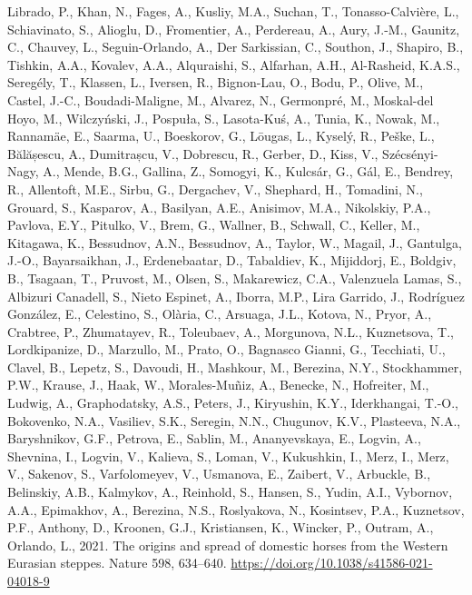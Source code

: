 \documentclass[preprint, 3p, authoryear]{elsarticle} %
\newlength{\cslhangindent}
\newlength{\cslentryspacingunit} %
\newenvironment{CSLReferences}[2] %
 {%
  \setlength{\parindent}{0pt}
  \ifodd #1
  \let\oldpar\par
  \def\par{\hangindent=\cslhangindent\oldpar}
  \fi
  \setlength{\parskip}{#2\cslentryspacingunit}
 }%
 {}
\begin{document}
\begin{CSLReferences}{1}{0}
\leavevmode{}%
Librado, P., Khan, N., Fages, A., Kusliy, M.A., Suchan, T., Tonasso-Calvière, L., Schiavinato, S., Alioglu, D., Fromentier, A., Perdereau, A., Aury, J.-M., Gaunitz, C., Chauvey, L., Seguin-Orlando, A., Der Sarkissian, C., Southon, J., Shapiro, B., Tishkin, A.A., Kovalev, A.A., Alquraishi, S., Alfarhan, A.H., Al-Rasheid, K.A.S., Seregély, T., Klassen, L., Iversen, R., Bignon-Lau, O., Bodu, P., Olive, M., Castel, J.-C., Boudadi-Maligne, M., Alvarez, N., Germonpré, M., Moskal-del Hoyo, M., Wilczyński, J., Pospuła, S., Lasota-Kuś, A., Tunia, K., Nowak, M., Rannamäe, E., Saarma, U., Boeskorov, G., Lōugas, L., Kyselý, R., Peške, L., Bălășescu, A., Dumitrașcu, V., Dobrescu, R., Gerber, D., Kiss, V., Szécsényi-Nagy, A., Mende, B.G., Gallina, Z., Somogyi, K., Kulcsár, G., Gál, E., Bendrey, R., Allentoft, M.E., Sirbu, G., Dergachev, V., Shephard, H., Tomadini, N., Grouard, S., Kasparov, A., Basilyan, A.E., Anisimov, M.A., Nikolskiy, P.A., Pavlova, E.Y., Pitulko, V., Brem, G., Wallner, B., Schwall, C., Keller, M., Kitagawa, K., Bessudnov, A.N., Bessudnov, A., Taylor, W., Magail, J., Gantulga, J.-O., Bayarsaikhan, J., Erdenebaatar, D., Tabaldiev, K., Mijiddorj, E., Boldgiv, B., Tsagaan, T., Pruvost, M., Olsen, S., Makarewicz, C.A., Valenzuela Lamas, S., Albizuri Canadell, S., Nieto Espinet, A., Iborra, M.P., Lira Garrido, J., Rodríguez González, E., Celestino, S., Olària, C., Arsuaga, J.L., Kotova, N., Pryor, A., Crabtree, P., Zhumatayev, R., Toleubaev, A., Morgunova, N.L., Kuznetsova, T., Lordkipanize, D., Marzullo, M., Prato, O., Bagnasco Gianni, G., Tecchiati, U., Clavel, B., Lepetz, S., Davoudi, H., Mashkour, M., Berezina, N.Y., Stockhammer, P.W., Krause, J., Haak, W., Morales-Muñiz, A., Benecke, N., Hofreiter, M., Ludwig, A., Graphodatsky, A.S., Peters, J., Kiryushin, K.Y., Iderkhangai, T.-O., Bokovenko, N.A., Vasiliev, S.K., Seregin, N.N., Chugunov, K.V., Plasteeva, N.A., Baryshnikov, G.F., Petrova, E., Sablin, M., Ananyevskaya, E., Logvin, A., Shevnina, I., Logvin, V., Kalieva, S., Loman, V., Kukushkin, I., Merz, I., Merz, V., Sakenov, S., Varfolomeyev, V., Usmanova, E., Zaibert, V., Arbuckle, B., Belinskiy, A.B., Kalmykov, A., Reinhold, S., Hansen, S., Yudin, A.I., Vybornov, A.A., Epimakhov, A., Berezina, N.S., Roslyakova, N., Kosintsev, P.A., Kuznetsov, P.F., Anthony, D., Kroonen, G.J., Kristiansen, K., Wincker, P., Outram, A., Orlando, L., 2021. The origins and spread of domestic horses from the {Western Eurasian} steppes. Nature 598, 634--640. \url{https://doi.org/10.1038/s41586-021-04018-9}


\end{CSLReferences}
\end{document}
